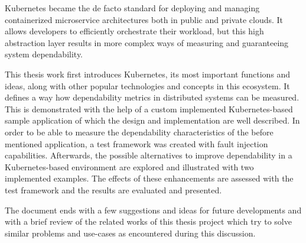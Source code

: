 Kubernetes became the de facto standard for deploying and managing containerized microservice architectures both in public and private clouds. It allows developers to efficiently orchestrate their workload, but this high abstraction layer results in more complex ways of measuring and guaranteeing system dependability.

This thesis work first introduces Kubernetes, its most important functions and ideas, along with other popular technologies and concepts in this ecosystem. It defines a way how dependability metrics in distributed systems can be measured. This is demonstrated with the help of a custom implemented Kubernetes-based sample application of which the design and implementation are well described. In order to be able to measure the dependability characteristics of the before mentioned application, a test framework was created with fault injection capabilities. Afterwards, the possible alternatives to improve dependability in a Kubernetes-based environment are explored and illustrated with two implemented examples. The effects of these enhancements are assessed with the test framework and the results are evaluated and presented.

The document ends with a few suggestions and ideas for future developments and with a brief review of the related works of this thesis project which try to solve similar problems and use-cases as encountered during this discussion.


\vfill
\selectthesislanguage

\setcounter{romanPage}{\value{page}}
